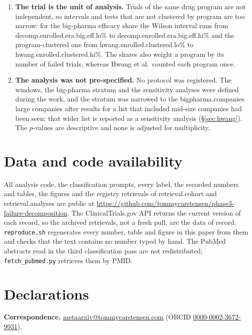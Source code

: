 \documentclass[11pt]{article}
\newcommand{\code}[1]{\texttt{\small #1}}
\begin{document}
\begin{enumerate}[leftmargin=*]
\item\label{lim:unit} \textbf{The trial is the unit of analysis.} Trials of the same drug program are not independent, so intervals and tests that are not clustered by program are too narrow: for the big-pharma efficacy share the Wilson interval runs from \num{decomp.enrolled.era.big.eff.lo}\% to \num{decomp.enrolled.era.big.eff.hi}\% and the program-clustered one from \num{hwang.enrolled.clustered.lo}\% to \num{hwang.enrolled.clustered.hi}\%. The shares also weight a program by its number of failed trials, whereas Hwang et al.\ counted each program once.
\item\label{lim:plan} \textbf{The analysis was not pre-specified.} No protocol was registered. The windows, the big-pharma stratum and the sensitivity analyses were defined during the work, and the stratum was narrowed to the \num{bigpharma.companies} large companies after results for a list that included mid-size companies had been seen; that wider list is reported as a sensitivity analysis (\S\ref{sec:hwang}). The $p$-values are descriptive and none is adjusted for multiplicity.
\end{enumerate}

\section{Data and code availability}\label{sec:availability}
All analysis code, the classification prompts, every label, the recorded numbers and tables, the figures and the registry retrievals of \num{retrieval.cohort} and \num{retrieval.analyses} are public at \url{https://github.com/tommycarstensen/phase3-failure-decomposition}. The ClinicalTrials.gov API returns the current version of each record, so the archived retrievals, not a fresh pull, are the data of record. \code{reproduce.sh} regenerates every number, table and figure in this paper from them and checks that the text contains no number typed by hand. The PubMed abstracts read in the third classification pass are not redistributed; \code{fetch\_pubmed.py} retrieves them by PMID.

\section{Declarations}\label{sec:declarations}
\noindent\textbf{Correspondence.} \href{mailto:metaarxiv@tommycarstensen.com}{metaarxiv@tommycarstensen.com} (ORCID \href{https://orcid.org/0000-0002-3672-9931}{0000-0002-3672-9931}).
\end{document}

